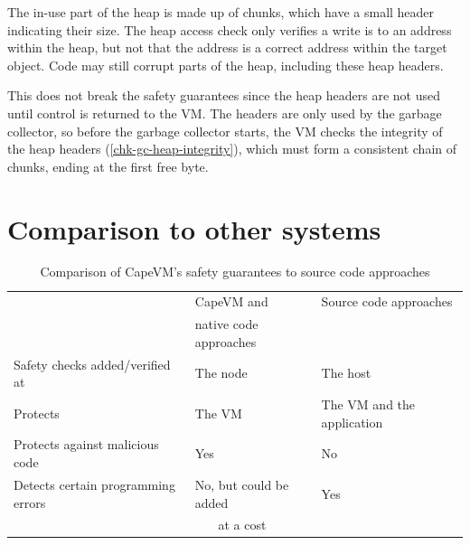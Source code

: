 The in-use part of the heap is made up of chunks, which have a small header indicating their size. The heap access check only verifies a write is to an address within the heap, but not that the address is a correct address within the target object. Code may still corrupt parts of the heap, including these heap headers.

This does not break the safety guarantees since the heap headers are not used until control is returned to the VM. The headers are only used by the garbage collector, so before the garbage collector starts, the VM checks the integrity of the heap headers (\ref{chk-gc-heap-integrity}), which must form a consistent chain of chunks, ending at the first free byte.



\section{Comparison to other systems}

\begin{table}
\caption{Comparison of CapeVM's safety guarantees to source code approaches}
\label{tbl-safety-comparison-source-code-approaches}
    \begin{tabular}{p{}p{}p{}} %
    \toprule
                                                & CapeVM and                                  & Source code approaches \\
                                                & native code approaches                      & \\
    \midrule
    \midrule
    Safety checks added/verified at             & The node                                    & The host \\
    Protects                                    & The VM                                      & The VM and the application \\
    Protects against malicious code             & Yes                                         & No \\
    Detects certain programming errors          & No, but could be added                      & Yes \\
                                                & ~~~ at a cost                               & \\
    \bottomrule
    \end{tabular}
\end{table}

